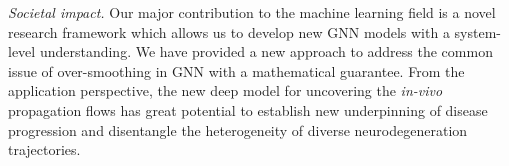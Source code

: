 \documentclass{article}
\begin{document}
\textit{Societal impact.} Our major contribution to the machine learning field is a novel research framework which allows us to develop new GNN models with a system-level understanding. We have provided a new approach to address the common issue of over-smoothing in GNN with a mathematical guarantee. From the application perspective, the new deep model for uncovering the \textit{in-vivo} propagation flows has great potential to establish new underpinning of disease progression and disentangle the heterogeneity of diverse neurodegeneration trajectories.












\end{document}
